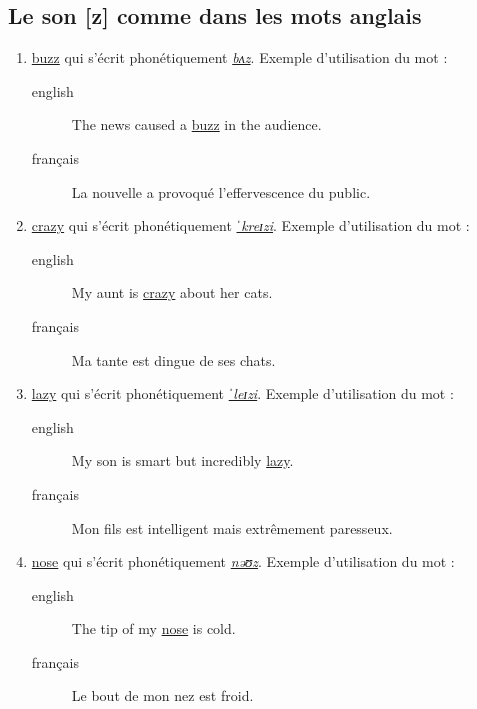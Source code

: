 \documentclass[12pt,a4paper]{book}
\begin{document}
\subsection{Le son [z] comme dans les mots anglais}
\label{sec:orgeeffa49}
\begin{enumerate}
\item \href{http://www.wordreference.com/enfr/buzz}{buzz} qui s'écrit phonétiquement \href{https://en.oxforddictionaries.com/definition/buzz}{\emph{bʌz}}. Exemple d'utilisation du mot :
\begin{description}
\item[{english}] \textenglish{The news caused a \href{https://youtu.be/OoQJUNv-Jlg}{buzz} in the audience.}
\item[{français}] La nouvelle a provoqué l'effervescence du public.
\end{description}
\item \href{http://www.wordreference.com/enfr/crazy}{crazy} qui s'écrit phonétiquement \href{https://en.oxforddictionaries.com/definition/crazy}{\emph{ˈkreɪzi}}. Exemple d'utilisation du mot :
\begin{description}
\item[{english}] \textenglish{My aunt is \href{https://youtu.be/U0EW0s1fN-8}{crazy} about her cats.}
\item[{français}] Ma tante est dingue de ses chats.
\end{description}
\item \href{http://www.wordreference.com/enfr/lazy}{lazy} qui s'écrit phonétiquement \href{https://en.oxforddictionaries.com/definition/lazy}{\emph{ˈleɪzi}}. Exemple d'utilisation du mot :
\begin{description}
\item[{english}] \textenglish{My son is smart but incredibly \href{https://youtu.be/3ev7GXzFTPg}{lazy}.}
\item[{français}] Mon fils est intelligent mais extrêmement paresseux.
\end{description}
\item \href{http://www.wordreference.com/enfr/nose}{nose} qui s'écrit phonétiquement \href{https://en.oxforddictionaries.com/definition/nose}{\emph{nəʊz}}. Exemple d'utilisation du mot :
\begin{description}
\item[{english}] \textenglish{The tip of my \href{https://youtu.be/1G-nn-b4TJA}{nose} is cold.}
\item[{français}] Le bout de mon nez est froid.
\end{description}
\end{enumerate}
\end{document}
